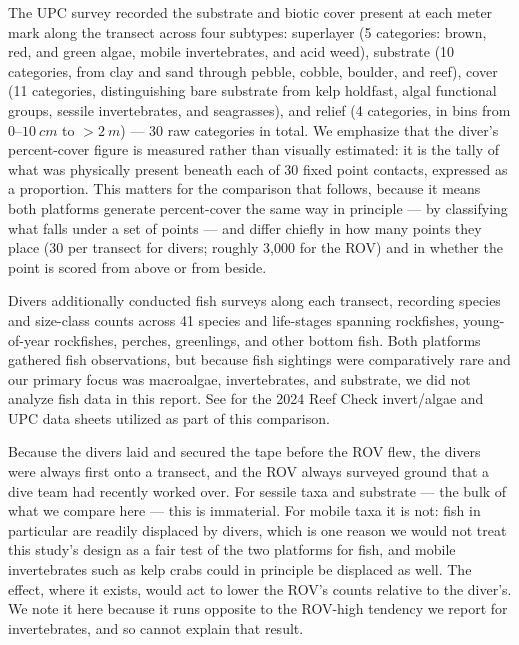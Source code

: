 \documentclass[11pt]{article}
\newcommand{\boxedref}[2]{%
	\begingroup
	\setlength{\fboxrule}{0.8pt}%
	\setlength{\fboxsep}{1.5pt}%
	\textcolor{linkcyan}{%
		\fbox{%
			\textcolor{black}{%
				\hyperref[#2]{#1~\ref*{#2}}%
			}%
		}%
	}%
	\endgroup
}
\newcommand{\figref}[1]{\boxedref{Fig.}{#1}}\newcommand{\tabref}[1]{\boxedref{Table}{#1}}
\begin{document}
The UPC survey recorded the substrate and biotic cover present at each meter
mark along the transect across four subtypes: superlayer (5 categories: brown,
red, and green algae, mobile invertebrates, and acid weed), substrate (10
categories, from clay and sand through pebble, cobble, boulder, and reef),
cover (11 categories, distinguishing bare substrate from kelp holdfast, algal
functional groups, sessile invertebrates, and seagrasses), and relief (4
categories, in bins from 0--$10~cm$ to $>2~m$) --- 30 raw categories in total.
We emphasize that the diver's percent-cover figure is measured rather
than visually estimated: it is the tally of what was physically present
beneath each of 30 fixed point contacts, expressed as a proportion.
This matters for the comparison that follows, because it means both platforms
generate percent-cover the same way in principle --- by classifying what falls
under a set of points --- and differ chiefly in how many points they place
(30 per transect for divers; roughly 3{,}000 for the ROV) and in whether the
point is scored from above or from beside.

Divers additionally conducted fish surveys along each transect, recording 
species and size-class counts across 41 species and life-stages spanning 
rockfishes, young-of-year rockfishes, perches, greenlings, and other bottom 
fish.
Both platforms gathered fish observations, but because fish sightings were
comparatively rare and our primary focus was macroalgae, invertebrates, and
substrate, we did not analyze fish data in this report.
See \figref{fig:data_sheets} for the 2024 Reef Check invert/algae and UPC data 
sheets utilized as part of this comparison. 

Because the divers laid and secured the tape before the ROV flew, the divers 
were always first onto a transect, and the ROV always surveyed ground that a 
dive team had recently worked over. 
For sessile taxa and substrate --- the bulk of what we compare here --- this is 
immaterial. 
For mobile taxa it is not: fish in particular are readily displaced by divers, 
which is one reason we would not treat this study's design as a fair test of 
the two platforms for fish, and mobile invertebrates such as kelp crabs could 
in principle be displaced as well.
The effect, where it exists, would act to lower the ROV's counts relative to
the diver's. 
We note it here because it runs opposite to the ROV-high
tendency we report for invertebrates, and so cannot explain that result.

\end{document}
